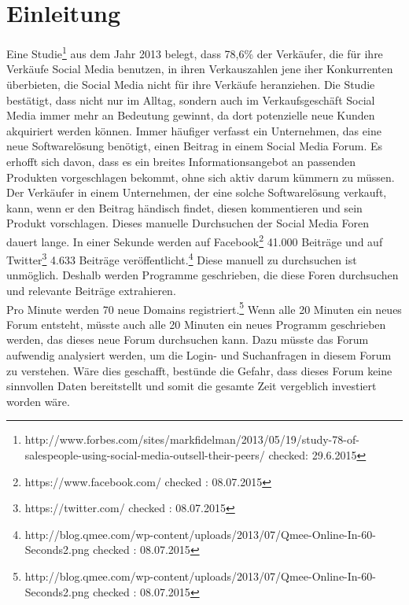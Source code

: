 
\section{Einleitung}
Eine Studie\footnote{http://www.forbes.com/sites/markfidelman/2013/05/19/study-78-of-salespeople-using-social-media-outsell-their-peers/ checked: 29.6.2015} aus dem Jahr 2013 belegt, dass 78,6\% der Verkäufer, die für ihre Verkäufe Social Media benutzen, in ihren Verkauszahlen jene iher Konkurrenten überbieten, die Social Media nicht für ihre Verkäufe heranziehen.
Die Studie bestätigt, dass nicht nur im Alltag, sondern auch im Verkaufsgeschäft Social Media immer mehr an Bedeutung gewinnt, da dort potenzielle neue Kunden akquiriert werden können. Immer häufiger verfasst ein Unternehmen, das eine neue Softwarelösung benötigt, einen Beitrag in einem Social Media Forum. Es erhofft sich davon, dass es ein breites Informationsangebot an passenden Produkten vorgeschlagen bekommt, ohne sich aktiv darum kümmern zu müssen. Der Verkäufer in einem Unternehmen, der eine solche Softwarelösung verkauft, kann, wenn er den Beitrag händisch findet, diesen kommentieren und sein Produkt vorschlagen. 
Dieses manuelle Durchsuchen der Social Media Foren dauert lange. In einer Sekunde werden auf Facebook\footnote{https://www.facebook.com/ checked : 08.07.2015} 41.000 Beiträge und auf Twitter\footnote{https://twitter.com/ checked : 08.07.2015} 4.633 Beiträge veröffentlicht.\footnote{http://blog.qmee.com/wp-content/uploads/2013/07/Qmee-Online-In-60-Seconds2.png checked : 08.07.2015} Diese manuell zu durchsuchen ist unmöglich. Deshalb werden Programme geschrieben, die diese Foren durchsuchen und relevante Beiträge extrahieren. \\ Pro Minute werden 70 neue Domains registriert.\footnote{http://blog.qmee.com/wp-content/uploads/2013/07/Qmee-Online-In-60-Seconds2.png checked : 08.07.2015} Wenn alle 20 Minuten ein neues Forum entsteht, müsste auch alle 20 Minuten ein neues Programm geschrieben werden, das dieses neue Forum durchsuchen kann. Dazu müsste das Forum aufwendig analysiert werden, um die Login- und Suchanfragen in diesem Forum zu verstehen. Wäre dies geschafft, bestünde die Gefahr, dass dieses Forum keine sinnvollen Daten bereitstellt und somit die gesamte Zeit vergeblich investiert worden wäre.\\
